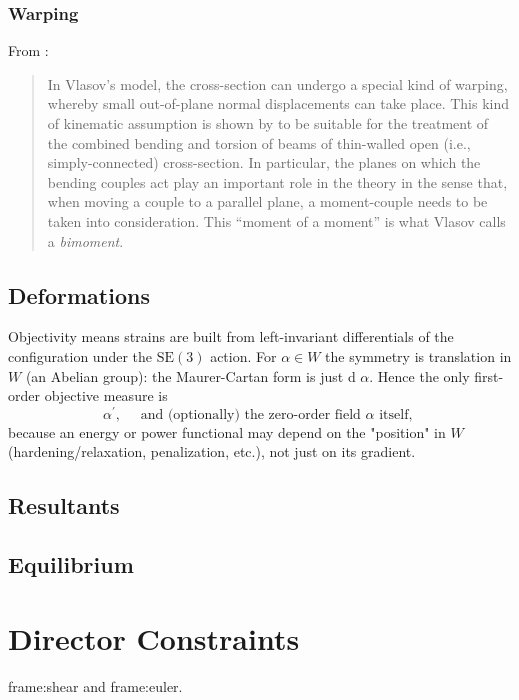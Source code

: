\subsubsection{Warping}
From \cite{epstein2019vlasovs}:
\begin{quote}
In Vlasov’s model, the cross-section can undergo a special kind of warping, whereby small out-of-plane normal displacements can take place. 
This kind of kinematic assumption is shown by \cite{vlasov1961thinwalled} to be suitable for the treatment of the combined bending and torsion of beams of thin-walled open (i.e., simply-connected) cross-section. 
In particular, the planes on which the bending couples act play an important role in the theory in the sense that, when moving a couple to a parallel plane, a moment-couple needs to be taken into consideration. 
This ``moment of a moment'' is what Vlasov calls a \emph{bimoment}.
\end{quote}

\subsection{Deformations}

Objectivity means strains are built from left-invariant differentials of the configuration under the $\mathrm{SE}(3)$ action.
For $\alpha \in W$ the symmetry is translation in $W$ (an Abelian group): the Maurer-Cartan form is just d $\alpha$. Hence the only first-order objective measure is
$$
\alpha^{\prime}, \quad \text { and (optionally) the zero-order field } \alpha \text { itself, }
$$
because an energy or power functional may depend on the "position" in $W$ (hardening/relaxation, penalization, etc.), not just on its gradient.

\subsection{Resultants}


\subsection{Equilibrium}



\section{Director Constraints}

\gls{frame:shear} and \gls{frame:euler}.


